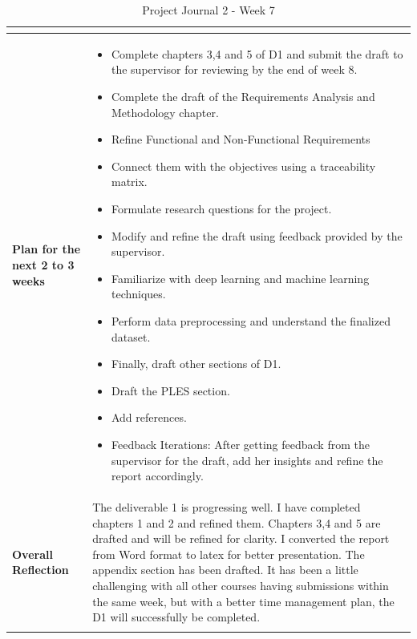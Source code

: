 \begin{longtable}{|p{4cm}|p{11cm}|}
\begin{itemize}
\end{itemize} \\
\hline
\textbf{Plan for the next 2 to 3 weeks} &
\begin{itemize}
\item Complete chapters 3,4 and 5 of D1 and submit the draft to the supervisor for reviewing by the end of week 8.
\item Complete the draft of the Requirements Analysis and Methodology chapter.
\item Refine Functional and Non-Functional Requirements 
\item Connect them with the objectives using a traceability matrix.
\item Formulate research questions for the project.
\item Modify and refine the draft using feedback provided by the supervisor.
\item Familiarize with deep learning and machine learning techniques.
\item Perform data preprocessing and understand the finalized dataset. 
\item Finally, draft other sections of D1.
\item Draft the PLES section.
\item Add references. 
\item Feedback Iterations: After getting feedback from the supervisor for the draft, add her insights and refine the report accordingly. 

\end{itemize} \\
\hline
\textbf{Overall Reflection} &
The deliverable 1 is progressing well. I have completed chapters 1 and 2 and refined them. Chapters 3,4 and 5 are drafted and will be refined for clarity. I converted the report from Word format to latex for better presentation. The appendix section has been drafted. It has been a little challenging with all other courses having submissions within the same week, but with a better time management plan, the D1 will successfully be completed.
 \\
\hline
\caption{ Project Journal 2 - Week 7}
\end{longtable}


